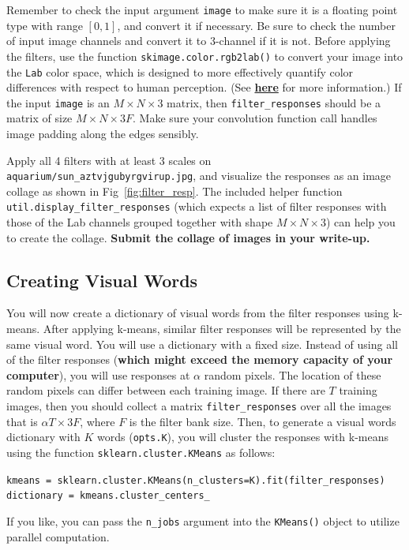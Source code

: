 \documentclass[10pt]{article}
\begin{document}
Remember to check the input argument {\tt image} to make sure it is a floating point type with range $[0, 1]$, and convert it if necessary. Be sure to check the number of input image channels and convert it to 3-channel if it is not. Before applying the filters, use the function {\tt skimage.color.rgb2lab()} to convert your image into the {\tt Lab} color space, which is designed to more effectively quantify color differences with respect to human perception. (See {\bf \href{https://en.wikipedia.org/wiki/CIELAB_color_space}{here}} for more information.) If the input {\tt image} is an $M \times N \times 3$ matrix, then {\tt filter\_responses} should be a matrix of size $M \times N \times 3F$. Make sure your convolution function call handles image padding along the edges sensibly.

Apply all 4 filters with at least 3 scales on {\tt aquarium/sun\_aztvjgubyrgvirup.jpg}, and visualize the responses as an image collage as shown in Fig~\ref{fig:filter_resp}.
The included helper function {\tt util.display\_filter\_responses} (which expects a list of filter responses with those of the Lab channels grouped together with shape $M \times N \times 3$) can help you to create the collage.
{\bf Submit the collage of images in your write-up.}

\subsection{Creating Visual Words}
You will now create a dictionary of visual words from the filter responses using k-means. After applying k-means, similar filter responses will be represented by the same visual word. You will use a dictionary with a fixed size. Instead of using all of the filter responses ({\bf which might exceed the memory capacity of your computer}), you will use responses at $\alpha$ random pixels. The location of these random pixels can differ between each training image. If there are $T$ training images, then you should collect a matrix {\tt filter\_responses} over all the images that is $\alpha T \times 3F$, where $F$ is the filter bank size.
Then, to generate a visual words dictionary with $K$ words ({\tt opts.K}), you will cluster the responses with k-means using the function {\tt sklearn.cluster.KMeans} as follows:
\begin{center}
    {\tt kmeans = sklearn.cluster.KMeans(n\_clusters=K).fit(filter\_responses) \\
    dictionary = kmeans.cluster\_centers\_ }
\end{center}
If you like, you can pass the {\tt n\_jobs} argument into the {\tt KMeans()} object to utilize parallel computation. \\
\end{document}
